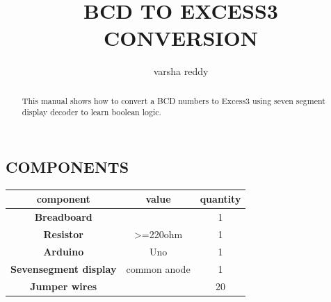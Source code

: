 \documentclass{article}
\title{\textbf {BCD TO EXCESS3 CONVERSION}}
\author{varsha reddy}
\begin{document}
\maketitle
\begin{tableofcontents}
\begin{abstract}
This manual shows how to convert a BCD numbers to Excess3 using seven segment display decoder to learn boolean logic.
\end{abstract}
\section{COMPONENTS}
\begin{tabular}{|c||c||c|}
\hline
\textbf{component} & {value} & {quantity} \\
\hline
 \textbf{Breadboard}  &  &  1  \\
 \hline
 \textbf{Resistor}  & {>=220ohm} & {1} \\
 \hline
 \textbf{Arduino} & {Uno} & 1\\
 \hline
 \textbf{Sevensegment display} & {common anode} & {1}\\
 \hline
 \textbf{Jumper wires} &   &  {20}\\
 \hline
\end{tabular}

\end{tableofcontents}
\end{document}
